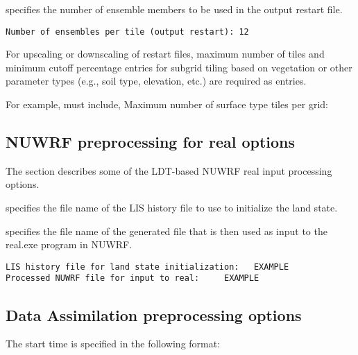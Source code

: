  
 specifies the number of ensemble members to be used in the output
 restart file. 
 

 \begin{Verbatim}[frame=single]
Number of ensembles per tile (output restart): 12
 \end{Verbatim}

 
 For upscaling or downscaling of restart files, maximum number of tiles and minimum 
 cutoff percentage entries for subgrid tiling based on vegetation or other 
 parameter types (e.g., soil type, elevation, etc.) are required as entries.

 For example, must include, Maximum number of surface type tiles per grid:
 


 
 \subsection{NUWRF preprocessing for real options} \label{ssec:nuwrfrealopts}
 

 
 The section describes some of the LDT-based NUWRF real input processing
 options.

  specifies the 
 file name of the LIS history file to use to initialize the land state.

  specifies the file
 name of the generated file that is then used as input to the real.exe
 program in NUWRF.

 
 \begin{Verbatim}[frame=single]
LIS history file for land state initialization:   EXAMPLE
Processed NUWRF file for input to real:     EXAMPLE
 \end{Verbatim}


 
 \subsection{Data Assimilation preprocessing options}
 \label{ssec:dapreprocopts}
 


 
 The start time is specified in the following format:

